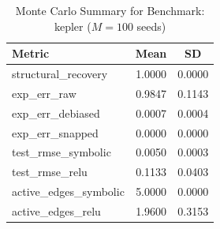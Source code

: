 \begin{table}[ht]
\centering
\caption{Monte Carlo Summary for Benchmark: kepler ($M = 100$ seeds)}
\begin{tabular}{lcc}
\hline
Metric & Mean & SD \\
\hline
structural\_recovery & 1.0000 & 0.0000 \\
exp\_err\_raw & 0.9847 & 0.1143 \\
exp\_err\_debiased & 0.0007 & 0.0004 \\
exp\_err\_snapped & 0.0000 & 0.0000 \\
test\_rmse\_symbolic & 0.0050 & 0.0003 \\
test\_rmse\_relu & 0.1133 & 0.0403 \\
active\_edges\_symbolic & 5.0000 & 0.0000 \\
active\_edges\_relu & 1.9600 & 0.3153 \\
\hline
\end{tabular}
\end{table}
